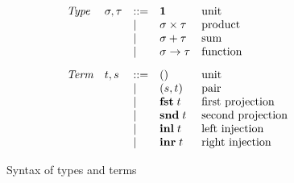 \begin{figure}
  \small
  \[
  \begin{array}{lllll}
    \textit{Type} &
    \sigma, \tau
    & ::= &
    \mathbf{1}
    &
    \text{unit}
    \\
    && | &
    \sigma \times \tau
    &
    \text{product}
    \\
    && | &
    \sigma + \tau
    &
    \text{sum}
    \\
    && | &
    \sigma \to \tau
    &
    \text{function}
    \\[3mm]
    \textit{Term} &
    t, s
    & ::= &
    ()
    &
    \text{unit}
    \\
    && | &
    (s,t)
    &
    \text{pair}
    \\
    && | &
    \mathbf{fst}\;t
    &
    \text{first projection}
    \\
    && | &
    \mathbf{snd}\;t
    &
    \text{second projection}
    \\
    && | &
    \mathbf{inl}\;t
    &
    \text{left injection}
    \\
    && | &
    \mathbf{inr}\;t
    &
    \text{right injection}
    \\
  \end{array}
  \]
  \caption{Syntax of types and terms }
\end{figure}
